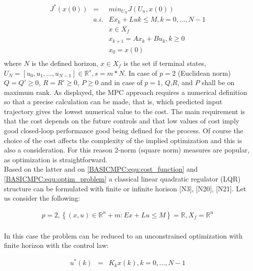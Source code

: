 		\begin{equation}
        \begin{array}{rcl}
				J^*(x(0))&=&min_{U_N}J(U_n,x(0))\\
					&a.i.&Ex_k+Luk\leq M,k=0,\dots,N-1\\
					&&x\in X_f\\
					&&x_{k+1}=Ax_k+Bu_k,k\geq0\\
					&&x_0=x(0)\\
        \end{array}
        \label{BASICMPC:equ:optim_problem}
    \end{equation}
		where $N$ is the defined horizon, $x\in X_f$ is the set if terminal states, $U_N=[u_0,u_1,\dots,u_{N-1}]\in\mathbb{R}^s,s=m*N$. In case of $p=2$ (Euclidean norm) $Q=Q'\geq0$, $R=R'\geq0$, $P\geq0$ and in case of $p=1$, $Q$,$R$, and $P$ shall be on maximum rank. As displayed, the MPC approach requires a numerical definition so that a precise calculation can be made, that is, which predicted input trajectory gives the lowest numerical value to the cost. The main requirement is that the cost depends on the future controls and that low values of cost imply good closed-loop performance good being defined for the process. Of course the choice of the cost affects the complexity of the implied optimization and this is also a consideration. For this reason 2-norm (square norm) measures are popular, as optimization is straightforward.\\
		Based on the latter and on \ref{BASICMPC:equ:cost_function} and \ref{BASICMPC:equ:optim_problem} a classical linear quadratic regulator (LQR) structure can be formulated with finite or infinite horison [N3], [N20], [N21].
		Let us consider the following:
		
		\begin{equation}
        \begin{array}{c}
         p=2, \left\{(x,u)\in\mathbb{R}^n+m:Ex+Lu\leq M\right\}=\mathbb{R},X_f=\mathbb{R}^n\\
        \end{array}
        \label{BASICMPC:equ:quadratic_case}
    \end{equation}
		
		In this case the problem can be reduced to an unconstrained optimization with finite horizon with the control law: 
		
		\begin{equation}
        \begin{array}{rcl}
         u^*(k)&=&K_kx(k), k=0,\dots,N-1\\
        \end{array}
        \label{BASICMPC:equ:control_law}
    \end{equation}
		
